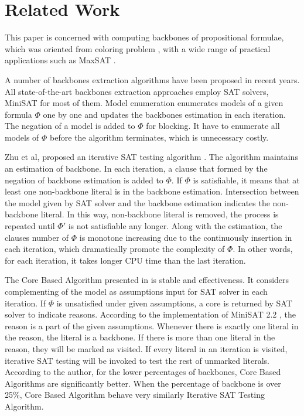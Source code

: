 \section{Related Work}\label{sec:relw}
This paper is concerned with computing backbones of propositional formulae, which was oriented from coloring problem \cite{CJG2001}, with a wide range of practical applications such as MaxSAT \cite{MMBM2005}.

A number of backbones extraction algorithms have been proposed in recent years. All state-of-the-art backbones extraction approaches employ SAT solvers, MiniSAT\cite{MINISAT} for most of them.
Model enumeration\cite{MK2002,RSF2004} enumerates models of a given formula $\Phi$ one by one and updates the backbones estimation in each iteration. The negation of a model is added to $\Phi$ for blocking. It have to enumerate all models of $\Phi$ before the algorithm terminates, which is unnecessary costly.

Zhu et al, proposed an iterative SAT testing algorithm \cite{Z11}. The algorithm maintains an estimation of backbone. In each iteration, a clause that formed by the negation of backbone estimation is added to $\Phi$. If $\Phi$ is satisfiable, it means that at least one non-backbone literal is in the backbone estimation. Intersection between the model given by SAT solver and the backbone estimation indicates the non-backbone literal. In this way, non-backbone literal is removed, the process is repeated until $\Phi'$ is not satisfiable any longer. Along with the estimation, the clauses number of $\Phi$  is monotone increasing due to the continuously insertion in each iteration, which dramatically promote the complexity of $\Phi$. In other words, for each iteration, it takes longer CPU time than the last iteration.

The Core Based Algorithm presented in \cite{JLM15} is stable and effectiveness. It considers complementing of the model as assumptions input for SAT solver in each iteration. If $\Phi$ is unsatisfied under given assumptions, a core is returned by SAT solver to indicate reasons. According to the implementation of MiniSAT 2.2 \cite{MINISAT}, the reason is a part of the given assumptions. Whenever there is exactly one literal in the reason, the literal is a backbone. If there is more than one literal in the reason, they will be marked as visited. If every literal in an iteration is visited, iterative SAT testing will be invoked to test the rest of unmarked literals. According to the author, for the lower percentages of backbones, Core Based Algorithms are significantly better. When the percentage of backbone is over 25\%, Core Based Algorithm behave very similarly Iterative SAT Testing Algorithm.
